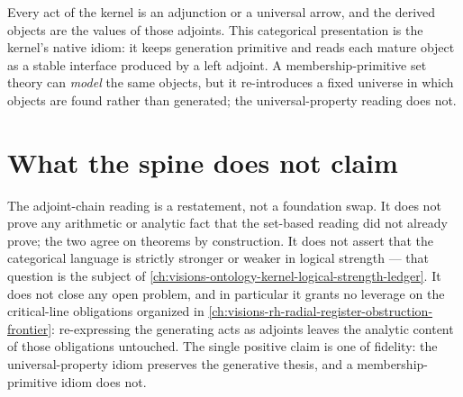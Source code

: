 \begin{principle}
\label{prin:ontology-kernel-faithful-home}
Every act of the kernel is an adjunction or a universal arrow, and the derived
objects are the values of those adjoints.  This categorical presentation is the
kernel's native idiom: it keeps generation primitive and reads each mature
object as a stable interface produced by a left adjoint.  A membership-primitive
set theory can \emph{model} the same objects, but it re-introduces a fixed
universe in which objects are found rather than generated; the universal-property
reading does not.
\end{principle}

\section{What the spine does not claim}
\label{sec:ontology-kernel-spine-cannot-claim}

The adjoint-chain reading is a restatement, not a foundation swap.  It does not
prove any arithmetic or analytic fact that the set-based reading did not already
prove; the two agree on theorems by construction.  It does not assert that the
categorical language is strictly stronger or weaker in logical strength --- that
question is the subject of
\autoref{ch:visions-ontology-kernel-logical-strength-ledger}.  It does not close
any open problem, and in particular it grants no leverage on the
critical-line obligations organized in
\autoref{ch:visions-rh-radial-register-obstruction-frontier}: re-expressing the
generating acts as adjoints leaves the analytic content of those obligations
untouched.  The single positive claim is one of fidelity: the universal-property
idiom preserves the generative thesis, and a membership-primitive idiom does
not.
